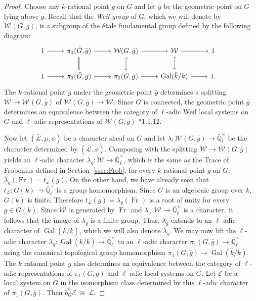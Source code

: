 \documentclass[10pt]{amsart}
\theoremstyle{plain}
\theoremstyle{definition}
\newcommand{\EE}{\mathbb{\bar Q}_\ell}
\newcommand{\bFq}{\bar{k}}
\newcommand{\Fq}{k}
\newcommand{\EEx}{\EE^\times}
\newcommand{\Weil}[1]{\mathcal{W}_{#1}}
\DeclareMathOperator{\Gal}{Gal}
\newcommand{\Frob}[1]{\operatorname{Fr}_{#1}}
\newcommand{\iso}{{\ \cong\ }}
\newcommand{\trFrob}[1]{t_{#1}}
\newcommand{\cs}[1]{{\mathcal{#1}}}
\newcommand{\gcs}[1]{{\mathcal{\bar #1}}}
\newcommand{\bg}{{\bar{g}}}
\newcommand{\bG}{\bar{G}}
\begin{document}
\iffalse
\begin{proof}
Choose any $\Fq$-rational point $g$ on $G$ and let $\bg$ be the geometric point on $G$ lying above $g$.
Recall that the \emph{Weil group} of $G$, which we will denote by $\Weil{}(G,\bg)$, is a subgroup of the \'etale
fundamental group defined by the following diagram:
\[
 \begin{tikzcd}
 1 \rar & \ar[equal]{d} \pi_1(\bG, \bg) \rar & \Weil{}(G,\bg) \rar \dar[hook] & \Weil{} \rar \dar[hook] & 1 \\
 1 \rar &  \pi_1(\bG, \bg) \rar & \pi_1(G,\bg) \rar & \Gal(\bFq/\Fq) \rar & 1.
 \end{tikzcd}
\]
The $\Fq$-rational point $g$ under the geometric point $\bg$ determines a splitting
$\Weil{}\to \Weil{}(G,\bg)$ of $\Weil{}(G,\bg)\to \Weil{}$.
%
  Since $G$ is connected, the geometric point $\bg$ determines
  an equivalence between the category of $\ell$-adic Weil local systems on $G$ and
  $\ell$-adic representations of $\Weil{}(G,\bg)$ \cite{deligne:80a}*{1.1.12}.
  
  Now let $(\gcs{L},\mu,\phi)$ be a character sheaf on $G$
  and let $\lambda : \Weil{}(G, \bg) \to \EEx$ be the character determined by $(\gcs{L},\phi)$.
  Composing with the splitting $\Weil{} \to \Weil{}(G,\bg)$ yields an $\ell$-adic character
  $\lambda_g : \Weil{} \to \EEx$, which is the same as the Trace of Frobenius defined in Section~\ref{ssec:Frob}, for every $\Fq$ rational point $g$ on $G$:
  $
  \lambda_g(\Frob{}) =  \trFrob{\cs{L}}(g).
  $
%
  On the other hand, we have already seen that $\trFrob{\cs{L}} : G(\Fq) \to \EEx$
  is a group homomorphism. 
  Since $G$ is an algebraic group over $\Fq$, $G(\Fq)$ is finite.
  Therefore $\trFrob{\cs{L}}(g) = \lambda_g(\Frob{})$ is a root of unity
  for every $g\in G(\Fq)$.  Since $\Weil{}$ is generated by
  $\Frob{}$ and $\lambda_g : \Weil{} \to \EEx$ is
  a character, it follows that the image of $\lambda_g$ is a finite group.
  Thus, $\lambda_g$ extends to an $\ell$-adic character of $\Gal(\bFq/\Fq)$,
  which we will also denote $\lambda_g$.
%
  We may now lift the $\ell$-adic character $\lambda_g : \Gal(\bFq/\Fq) \to \EEx$
  to an $\ell$-adic character $\pi_1(G,\bg) \to \EEx$ using the canonical topological group homomorphism
  $\pi_1(G,\bg) \to \Gal(\bFq/\Fq)$. 
  The $\Fq$ rational point $g$ also
  determines an equivalence between the category of $\ell$-adic
  representations of $\pi_1(G,\bg)$ and $\ell$-adic local systems on $G$. Let
  $\cs{E}$ be a local system on $G$ in the isomorphism class
  determined by this $\ell$-adic character of $\pi_1(G,\bg)$.
  Then $b_G^*\cs{E} \iso \gcs{L}$.
  

\end{proof}
\end{document}
